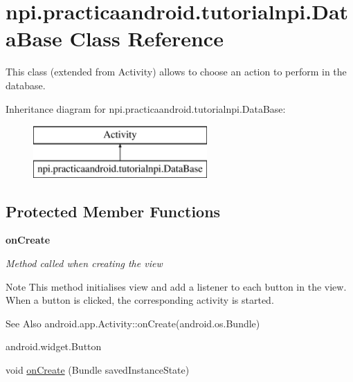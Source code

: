 \hypertarget{classnpi_1_1practicaandroid_1_1tutorialnpi_1_1_data_base}{\section{npi.\-practicaandroid.\-tutorialnpi.\-Data\-Base Class Reference}
\label{classnpi_1_1practicaandroid_1_1tutorialnpi_1_1_data_base}
}


This class (extended from Activity) allows to choose an action to perform in the database.  


Inheritance diagram for npi.\-practicaandroid.\-tutorialnpi.\-Data\-Base\-:\begin{figure}[H]
\begin{center}
\leavevmode
\includegraphics[height=2.000000cm]{classnpi_1_1practicaandroid_1_1tutorialnpi_1_1_data_base}
\end{center}
\end{figure}
\subsection*{Protected Member Functions}
\begin{Indent}{\bf on\-Create}\par
{\em Method called when creating the view

\begin{DoxyNote}{Note}
This method initialises view and add a listener to each button in the view. When a button is clicked, the corresponding activity is started. 
\end{DoxyNote}
\begin{DoxySeeAlso}{See Also}
android.\-app.\-Activity\-::on\-Create(android.\-os.\-Bundle) 

android.\-widget.\-Button 
\end{DoxySeeAlso}
}\begin{DoxyCompactItemize}
\item 
void \hyperlink{classnpi_1_1practicaandroid_1_1tutorialnpi_1_1_data_base_abbcbcc6c64ae6de15d4bb0aa70f8b3de}{on\-Create} (Bundle saved\-Instance\-State)
\end{DoxyCompactItemize}
\end{Indent}


